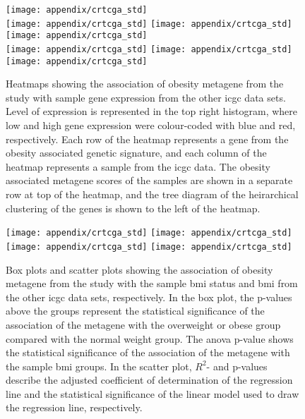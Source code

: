 \begin{appendices}
	\begin{figure}[htp!]
		\centering
		\texttt{[image: appendix/crtcga\_std]}\\
		\vspace{1em}
		\texttt{[image: appendix/crtcga\_std]}
		\texttt{[image: appendix/crtcga\_std]}
		\texttt{[image: appendix/crtcga\_std]}\\
		\vspace{1em}
		\texttt{[image: appendix/crtcga\_std]}
		\texttt{[image: appendix/crtcga\_std]}
		\texttt{[image: appendix/crtcga\_std]}\\
		\caption[Obesity metagene from the \citet{Creighton2012} study and the sample gene expressions in the other \gls{icgc} cancer types]{Heatmaps showing the association of obesity metagene from the \citet{Creighton2012} study with sample gene expression from the other \gls{icgc} data sets.
		Level of expression is represented in the top right histogram, where low and high gene expression were colour-coded with blue and red, respectively.
		Each row of the heatmap represents a gene from the obesity associated genetic signature, and each column of the heatmap represents a sample from the \gls{icgc} data.
		The obesity associated metagene scores of the samples are shown in a separate row at top of the heatmap, and the tree diagram of the heirarchical clustering of the genes is shown to the left of the heatmap. }
		\label{fig:appendix/cr_icgc_heatmap}
	\end{figure}

	\begin{figure}[htpb]
		\centering
		\texttt{[image: appendix/crtcga\_std]}
		\hfill
		\texttt{[image: appendix/crtcga\_std]}\\
		\texttt{[image: appendix/crtcga\_std]}
		\hfill
		\texttt{[image: appendix/crtcga\_std]}\\
		\caption[Obesity metagene from the \citet{Creighton2012} study and the sample \gls{bmi}/\gls{bmi} status in the other \gls{icgc} cancer types]{Box plots and scatter plots showing the association of obesity metagene from the \citet{Creighton2012} study with the sample \gls{bmi} status  and \gls{bmi} from the other \gls{icgc} data sets, respectively.
		In the box plot, the p-values above the groups represent the statistical significance of the association of the metagene with the overweight or obese group compared with the normal weight group.
		The \gls{anova} p-value shows the statistical significance of the association of the metagene with the sample \gls{bmi} groups.
		In the scatter plot, $R^2$- and p-values describe the adjusted coefficient of determination of the regression line and the statistical significance of the linear model used to draw the regression line, respectively.}
		\label{fig:appendix/cr_icgc_box_scatter}
	\end{figure}


\end{appendices}
